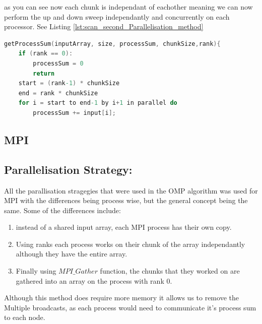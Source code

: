 as you can see now each chunk is independant of eachother meaning we can now perform the up and down sweep independantly and concurrently on each processor. See Listing \ref{lst:scan_second_Parallelisation_method} 
\begin{lstlisting}[language=C, caption={Serial Sequenctial Scan Algorithm with + operator}, label={lst:scan_second_Parallelisation_method}]
getProcessSum(inputArray, size, processSum, chunkSize,rank){ 
	if (rank == 0):  
		processSum = 0 
		return 
	start = (rank-1) * chunkSize 
	end = rank * chunkSize
	for i = start to end-1 by i+1 in parallel do
		processSum += input[i];
\end{lstlisting}
\subsection{MPI}
\subsection*{Parallelisation Strategy:}
All the parallisation stragegies that were used in the OMP algorithm was used for MPI with the differences being process wise, but the general concept being the same. Some of the differences include: 
\begin{enumerate}
	\item instead of a shared input array, each MPI process has their own copy.
	\item Using ranks each process works on their chunk of the array independantly although they have the entire array.
	\item Finally using ${MPI\_Gather}$ function, the chunks that they worked on are gathered into an array on the process with rank 0. 
\end{enumerate}
Although this method does require more memory it allows us to remove the Multiple broadcasts, as each process would need to communicate it's process sum to each node.  
